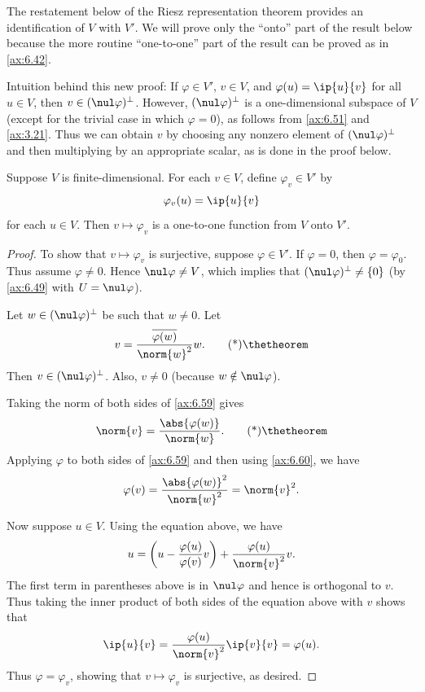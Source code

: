 The restatement below of the Riesz representation theorem provides an
identification of $V$ with $V'$. We will prove only the ``onto'' part of the
result below because the more routine ``one-to-one'' part of the result can be
proved as in \ref{ax:6.42}.

Intuition behind this new proof: If $\varphi\in V'$, $v\in V$, and
$\varphi(u)=\ip{u}{v}$ for all $u\in V$, then $v\in(\nul\varphi)^\perp$.
However, $(\nul\varphi)^\perp$ is a one-dimensional subspace of $V$ (except for
the trivial case in which $\varphi=0$), as follows from \ref{ax:6.51} and
\ref{ax:3.21}. Thus we can obtain $v$ by choosing any nonzero element of
$(\nul\varphi)^\perp$ and then multiplying by an appropriate scalar, as is done
in the proof below.

\begin{result}\label{ax:6.58}
Suppose $V$ is finite-dimensional. For each $v\in V$, define
$\varphi_v\in V'$ by
\[ \varphi_v(u) = \ip{u}{v} \]
for each $u\in V$. Then $v\mapsto\varphi_v$ is a one-to-one function from $V$
onto $V'$.
\end{result}

%
\begin{proof}
To show that $v\mapsto\varphi_v$ is surjective, suppose $\varphi\in V'$. If
$\varphi=0$, then $\varphi=\varphi_0$. Thus assume $\varphi\ne0$. Hence
$\nul\varphi\ne V$, which implies that $(\nul\varphi)^\perp\ne\{0\}$ (by
\ref{ax:6.49} with $U=\nul\varphi$).

Let $w\in(\nul\varphi)^\perp$ be such that $w\ne0$. Let
\begin{equation*}
v = \frac{\overline{\varphi(w)}}{\norm{w}^2}w. \axeqtag
\end{equation*}
Then $v\in(\nul\varphi)^\perp$. Also, $v\ne0$ (because
$w\notin\nul\varphi$).

Taking the norm of both sides of \ref{ax:6.59} gives
\begin{equation*}
\norm{v} = \frac{\abs{\varphi(w)}}{\norm{w}}. \axeqtag
\end{equation*}
Applying $\varphi$ to both sides of \ref{ax:6.59} and then using
\ref{ax:6.60}, we have
\[ \varphi(v) = \frac{\abs{\varphi(w)}^2}{\norm{w}^2} = \norm{v}^2. \]

Now suppose $u\in V$. Using the equation above, we have
\[ u = \biggl(u-\frac{\varphi(u)}{\varphi(v)}v\biggr)
     + \frac{\varphi(u)}{\norm{v}^2}v. \]
The first term in parentheses above is in $\nul\varphi$ and hence is orthogonal
to $v$. Thus taking the inner product of both sides of the equation above with
$v$ shows that
\[ \ip{u}{v} = \frac{\varphi(u)}{\norm{v}^2}\ip{v}{v} = \varphi(u). \]
Thus $\varphi=\varphi_v$, showing that $v\mapsto\varphi_v$ is surjective, as
desired.
\end{proof}

